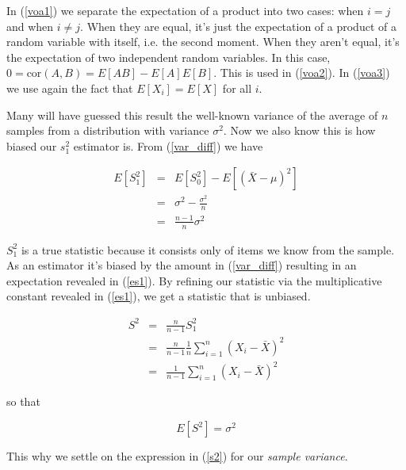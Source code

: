 \documentclass[]{article}
\begin{document}
In (\ref{voa1}) we separate the expectation of a product into two cases:
when $i=j$ and when $i \ne j$.  When they are equal, it's just the expectation of a
product of a random variable with itself, i.e. the second moment.  When they aren't
equal, it's the expectation of two independent random variables.  In this case,
$0 = \mbox{cor}(A,B) = E[AB] - E[A]E[B]$.  This is used in (\ref{voa2}).  In
(\ref{voa3}) we use again the fact that $E[X_i] = E[X]$ for all $i$.

Many will have guessed this result the well-known variance of the average 
of $n$ samples from a distribution with variance $\sigma^2$.  Now we also
know this is how biased our $s_1^2$ estimator is.  From (\ref{var_diff})
we have

\begin{eqnarray}
E \left[ S_1^2 \right] &= & E \left[ S_0^2 \right] - E \left[ (\bar{X} - \mu)^2 \right] \nonumber \\
   &= & \sigma^2 - \frac{\sigma^2}{n} \nonumber \\
   &= & \frac{n-1}{n} \sigma^2 \label{es1} 
\end{eqnarray}

$S_1^2$ is a true statistic because it consists only of items we know
from the sample.  As an estimator it's biased by the amount in
(\ref{var_diff}) resulting in an expectation revealed in (\ref{es1}).
By refining our statistic via the multiplicative constant revealed in
(\ref{es1}), we get a statistic that is unbiased.

\begin{eqnarray}
S^2 &= & \frac{n}{n-1} S_1^2 \nonumber \\
    &= & \frac{n}{n-1} \frac{1}{n} \sum_{i=1}^n \left( X_i - \bar{X} \right)^2 \nonumber \\
    &= & \frac{1}{n-1} \sum_{i=1}^n \left( X_i - \bar{X} \right)^2 \label{s2}
\end{eqnarray}

so that

$$
E \left[S^2 \right] = \sigma^2
$$

This why we settle on the expression in (\ref{s2}) for our \emph{sample variance}.
\end{document}
